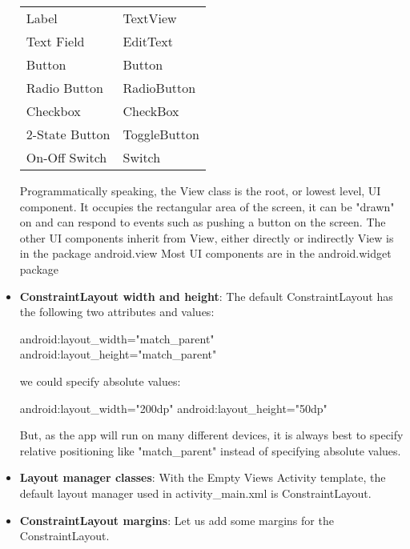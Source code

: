 \documentclass{report}
\begin{document}
\begin{itemize}
\begin{center}
\begin{center}
\begin{tabular}{p{4cm}|p{4cm}}
                        Label& TextView \\
                        Text Field &EditText \\
                        Button &Button \\
                        Radio Button &RadioButton \\
                        Checkbox &CheckBox \\
                        2-State Button &ToggleButton \\
                        On-Off Switch &Switch 
                    \end{tabular}
                \end{center}
            \end{center}
            Programmatically speaking, the View class is the root, or lowest level, UI component.
            \bigbreak \noindent 
            It occupies the rectangular area of the screen, it can be "drawn" on and can respond to events such as pushing a button on the screen.
            \bigbreak \noindent 
            The other UI components inherit from View, either directly or indirectly
            \bigbreak \noindent 
            View is in the package android.view
            \bigbreak \noindent 
            Most UI components are in the android.widget package
        \item \textbf{ConstraintLayout width and height}:
            The default ConstraintLayout has the following two attributes and values:
            \bigbreak \noindent 
            \begin{javacode}
                android:layout_width="match_parent"
                android:layout_height="match_parent"
            \end{javacode}
            \bigbreak \noindent 
            we could specify absolute values:
            \bigbreak \noindent 
            \begin{javacode}
                android:layout_width="200dp"
                android:layout_height="50dp"
            \end{javacode}
            \bigbreak \noindent 
            But, as the app will run on many different devices, it is always best to specify relative positioning like "match\_parent" instead of specifying absolute values.
        \item \textbf{Layout manager classes}:
            With the Empty Views Activity template, the default layout manager used in activity\_main.xml is ConstraintLayout.
        \item \textbf{ConstraintLayout margins}: Let us add some margins for the ConstraintLayout.

\end{itemize}
\end{document}
